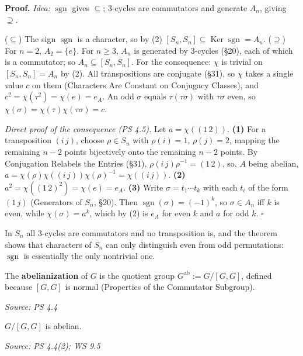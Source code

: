\documentclass[11pt]{report}
\newcommand{\sgn}{\operatorname{sgn}}
\renewenvironment{proof}[1][Proof]{\noindent\textbf{#1.} }{\hfill$\square$\par\vspace{5pt}}
\newcommand{\srcline}[1]{\par\hfill{\footnotesize\textit{Source: #1}}}
\begin{document}
\begin{proof}
\textit{Idea:} $\sgn$ gives $\subseteq$; $3$-cycles are commutators and generate $A_n$, giving $\supseteq$.\par
($\subseteq$) The sign $\sgn$ is a character, so by (2) $[S_n, S_n] \subseteq \operatorname{Ker}\sgn = A_n$. ($\supseteq$) For $n = 2$, $A_2 = \{e\}$. For $n \geq 3$, $A_n$ is generated by $3$-cycles (\S 20), each of which is a commutator; so $A_n \subseteq [S_n, S_n]$. For the consequence: $\chi$ is trivial on $[S_n, S_n] = A_n$ by (2). All transpositions are conjugate (\S 31), so $\chi$ takes a single value $c$ on them (Characters Are Constant on Conjugacy Classes), and $c^2 = \chi(\tau^2) = \chi(e) = e_A$. An odd $\sigma$ equals $\tau(\tau\sigma)$ with $\tau\sigma$ even, so $\chi(\sigma) = \chi(\tau)\chi(\tau\sigma) = c$.

\emph{Direct proof of the consequence (PS 4.5).} Let $a = \chi((1\,2))$. \textbf{(1)} For a transposition $(i\,j)$, choose $\rho \in S_n$ with $\rho(i) = 1$, $\rho(j) = 2$, mapping the remaining $n - 2$ points bijectively onto the remaining $n - 2$ points. By Conjugation Relabels the Entries (\S 31), $\rho(i\,j)\rho^{-1} = (1\,2)$, so, $A$ being abelian, $a = \chi(\rho)\chi((i\,j))\chi(\rho)^{-1} = \chi((i\,j))$. \textbf{(2)} $a^2 = \chi((1\,2)^2) = \chi(e) = e_A$. \textbf{(3)} Write $\sigma = t_1 \cdots t_k$ with each $t_i$ of the form $(1\,j)$ (Generators of $S_n$, \S 20). Then $\sgn(\sigma) = (-1)^k$, so $\sigma \in A_n$ iff $k$ is even, while $\chi(\sigma) = a^k$, which by (2) is $e_A$ for even $k$ and $a$ for odd $k$.
\end{proof}

\begin{rembox}\label{rem:what-theorem-says-about-sn}
In $S_n$ all $3$-cycles are commutators and no transposition is, and the theorem shows that characters of $S_n$ can only distinguish even from odd permutations: $\sgn$ is essentially the only nontrivial one.
\end{rembox}

\begin{defbox}[{Abelianization}]\label{def:abelianization}
The \textbf{abelianization} of $G$ is the quotient group $G^{\mathrm{ab}} := G/[G,G]$, defined because $[G,G]$ is normal (Properties of the Commutator Subgroup).
\srcline{PS 4.4}
\end{defbox}

\begin{propbox}\label{prop:abelianization-abelian}
$G/[G,G]$ is abelian.
\srcline{PS 4.4(2); WS 9.5}
\end{propbox}
\end{document}
